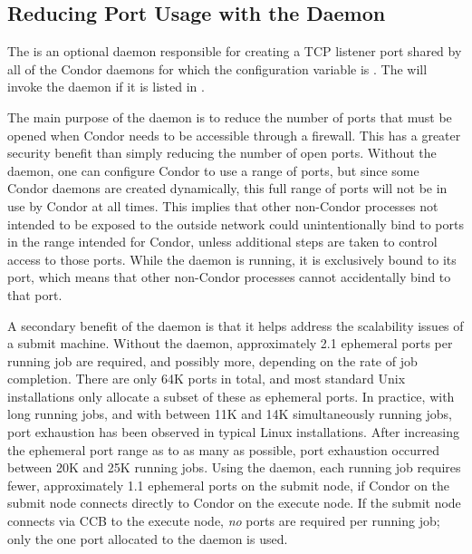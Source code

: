 \subsection{\label{sec:shared-port-daemon}Reducing Port Usage with the  Daemon}

The  is an optional daemon
responsible for creating a TCP listener port shared by all of the
Condor daemons for which the configuration variable
 is .
The  will invoke the  daemon
if it is listed in .

The main purpose of the  daemon is to reduce the
number of ports that must be opened when Condor needs to be
accessible through a firewall.
This has a greater security benefit
than simply reducing the number of open ports.
Without the  daemon,
one can configure Condor to use a range of ports,
but since some Condor daemons are created dynamically, 
this full range of ports will not be in use by Condor at all times.
This implies that other non-Condor processes not intended to be exposed to
the outside network could unintentionally bind to ports in the range
intended for Condor,
unless additional steps are taken to control access to those ports.  
While the  daemon is running,
it is exclusively bound to its port, which means that other non-Condor
processes cannot accidentally bind to that port.

A secondary benefit of the  daemon
is that it helps address the scalability issues of a submit machine.
Without the  daemon,
approximately 2.1 ephemeral ports per running job are required,
and possibly more, depending on the rate of job completion.
There are only 64K ports in total,
and most standard Unix installations only allocate a subset of
these as ephemeral ports.
In practice, with long running jobs,
and with between 11K and 14K simultaneously running jobs,
port exhaustion has been observed in typical Linux installations.
After increasing the ephemeral port range as to as many as possible,
port exhaustion occurred between 20K and 25K running jobs.
Using the  daemon,
each running job requires fewer, approximately 1.1 ephemeral ports
on the submit node, if Condor on the submit node connects directly
to Condor on the execute node.
If the submit node connects via CCB to the execute
node, \emph{no} ports are required per running job; only the one port
allocated to the  daemon is used.

